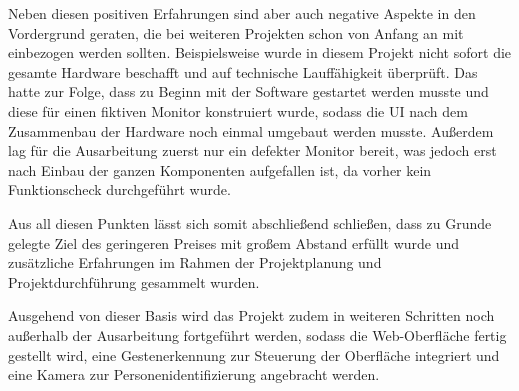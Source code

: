 Neben diesen positiven Erfahrungen sind aber auch negative Aspekte in den Vordergrund geraten, die bei weiteren Projekten schon von Anfang an mit einbezogen werden sollten. Beispielsweise wurde in diesem Projekt nicht sofort die gesamte Hardware beschafft und auf technische Lauffähigkeit überprüft. Das hatte zur Folge, dass zu Beginn mit der Software gestartet werden musste und diese für einen fiktiven Monitor konstruiert wurde, sodass die UI nach dem Zusammenbau der Hardware noch einmal umgebaut werden musste. Außerdem lag für die Ausarbeitung zuerst nur ein defekter Monitor bereit, was jedoch erst nach Einbau der ganzen Komponenten aufgefallen ist, da vorher kein Funktionscheck durchgeführt wurde.

Aus all diesen Punkten lässt sich somit abschließend schließen, dass zu Grunde gelegte Ziel des geringeren Preises mit großem Abstand erfüllt wurde und zusätzliche Erfahrungen im Rahmen der Projektplanung und Projektdurchführung gesammelt wurden.

Ausgehend von dieser Basis wird das Projekt zudem in weiteren Schritten noch außerhalb der Ausarbeitung fortgeführt werden, sodass die Web-Oberfläche fertig gestellt wird, eine Gestenerkennung zur Steuerung der Oberfläche integriert und eine Kamera zur Personenidentifizierung angebracht werden.